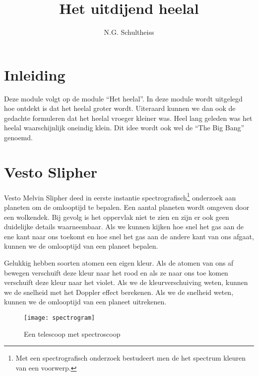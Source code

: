 



\title{Het uitdijend heelal}
\author{N.G. Schultheiss}
\date{}

\maketitle
\thispagestyle{firststyle}

\section{Inleiding}

Deze module volgt op de module ``Het heelal''. In deze module wordt
uitgelegd hoe ontdekt is dat het heelal groter wordt. Uiteraard kunnen
we dan ook de gedachte formuleren dat het heelal vroeger kleiner was.
Heel lang geleden was het heelal waarschijnlijk oneindig klein. Dit
idee wordt ook wel de ``The Big Bang'' genoemd.


\section{Vesto Slipher}

Vesto Melvin Slipher deed in eerste instantie
spectrografisch\footnote{Met een spectrografisch onderzoek bestudeert
men de het spectrum kleuren van een voorwerp.} onderzoek aan planeten om
de omlooptijd te bepalen. Een aantal planeten wordt omgeven door een
wolkendek. Bij gevolg is het oppervlak niet te zien en zijn er ook geen
duidelijke details waarneembaar. Als we kunnen kijken hoe snel het gas
aan de ene kant naar ons toekomt en hoe snel het gas aan de andere kant
van ons afgaat, kunnen we de omlooptijd van een planeet bepalen. 

Gelukkig hebben soorten atomen een eigen kleur. Als de atomen van
ons af bewegen verschuift deze kleur naar het rood en als ze naar
ons toe komen verschuift deze kleur naar het violet. Als we de kleurverschuiving
weten, kunnen we de snelheid met het Doppler effect berekenen. Als
we de snelheid weten, kunnen we de omlooptijd van een planeet uitrekenen.

\begin{figure}[h]
\noindent \begin{centering}
\texttt{[image: spectrogram]}
\par\end{centering}

\caption{Een telescoop met spectroscoop}
\end{figure}


